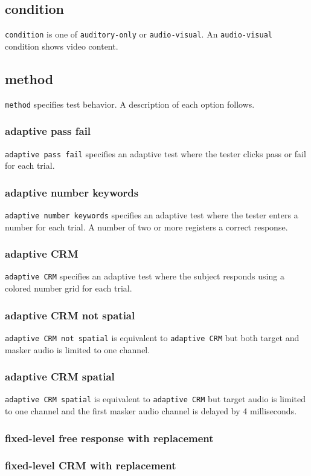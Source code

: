 \documentclass[11pt,pdftex,letterpaper]{article}
\begin{document}
\subsection{condition}
\texttt{condition} is one of \texttt{auditory-only} or \texttt{audio-visual}. An \texttt{audio-visual} condition shows video content.
\subsection{method}
\texttt{method} specifies test behavior. A description of each option follows.
\subsubsection{adaptive pass fail}
\texttt{adaptive pass fail} specifies an adaptive test where the tester clicks pass or fail for each trial.
\subsubsection{adaptive number keywords}
\texttt{adaptive number keywords} specifies an adaptive test where the tester enters a number for each trial. A number of two or more registers a correct response.
\subsubsection{adaptive CRM}
\texttt{adaptive CRM} specifies an adaptive test where the subject responds using a colored number grid for each trial.
\subsubsection{adaptive CRM not spatial}
\texttt{adaptive CRM not spatial} is equivalent to \texttt{adaptive CRM} but both target and masker audio is limited to one channel.
\subsubsection{adaptive CRM spatial}
\texttt{adaptive CRM spatial} is equivalent to \texttt{adaptive CRM} but target audio is limited to one channel and the first masker audio channel is delayed by 4 milliseconds.
\subsubsection{fixed-level free response with replacement}
\subsubsection{fixed-level CRM with replacement}
\end{document}
